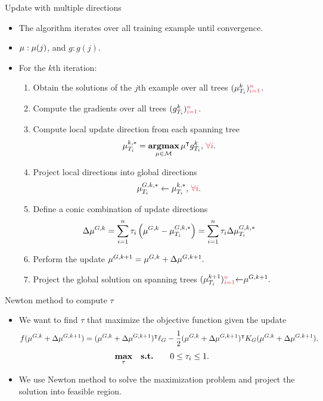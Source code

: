 \documentclass[first=dgreen,second=purple,logo=yellowexc]{aaltoslides}
\begin{document}
\begin{frame}{Update with multiple directions}
	\begin{itemize}\footnotesize
		\item The algorithm iterates over all training example until convergence.
		\item $\mathbf {\mu}:\mathbf {\mu}(j)$, and $g:g(j)$.
		\item For the $k$th iteration:
		\begin{enumerate}\footnotesize
			\item Obtain the solutions of the $j$th example over all trees $(\vmu_{T_i}^k){\color{aaltored}_{i=1}^n}$.
			\item Compute the gradients over all trees $(g_{T_i}^k){\color{aaltored}_{i=1}^n}$.
			\item Compute local update direction from each spanning tree
			\begin{align*}
				{\vmu}_{T_i}^{k,*} = \underset{\vmu\in\Mcal}{\argmax}\,\vmu\tp g_{T_i}^k,\,{\color{aaltored}\forall i}.
			\end{align*}
			\item Project local directions into global directions
			\begin{align*}
				{\vmu}_{T_i}^{G,k,*} \leftarrow {\vmu}_{T_i}^{k,*},\,{\color{aaltored}\forall i}.
			\end{align*}
			\item Define a conic combination of update directions 
			\begin{align*}
				\Delta{\mathbf {\mu}}^{G,k} = \sum_{i=1}^{n}\tau_i \left({\mathbf {\mu}}^{G,k} -{\mathbf {\mu}}_{T_i}^{G,k,*}\right) = \sum_{i=1}^{n}\tau_i \Delta{\mathbf {\mu}}_{T_i}^{G,k,*}
			\end{align*}
			\item Perform the update $\mathbf {\mu}^{G,k+1} = \mathbf {\mu}^{G,k} + \Delta{\mathbf {\mu}}^{G,k+1}.$
			\item Project the global solution on spanning trees $(\vmu_{T_i}^{k+1}){\color{aaltored}_{i=1}^{n}}{\leftarrow}\vmu^{G,k+1}.$
		\end{enumerate}
	\end{itemize}
\end{frame}


\begin{frame}{Newton method to compute $\tau$}
	\begin{itemize}\footnotesize
		\item We want to find $\tau$ that maximize the objective function given the update
		\begin{align*}\footnotesize
			f(\mathbf {\mu}^{G,k} + \Delta{\mathbf {\mu}}^{G,k+1}) = (\mathbf {\mu}^{G,k} + \Delta{\mathbf {\mu}}^{G,k+1})^{\intercal}\ell_G - \frac{1}{2}(\mathbf {\mu}^{G,k} + \Delta{\mathbf {\mu}}^{G,k+1})^{\intercal} K_G (\mathbf {\mu}^{G,k} + \Delta{\mathbf {\mu}}^{G,k+1}).
		\end{align*}
		\begin{align*}
			\underset{\tau}{\textbf{max}} & \quad 
			\textbf{s.t.} & \quad 0\le\tau_i\le1.
		\end{align*}
		\item We use Newton method to solve the maximization problem and project the solution into feasible region.
	\end{itemize}
\end{frame}
\end{document}
